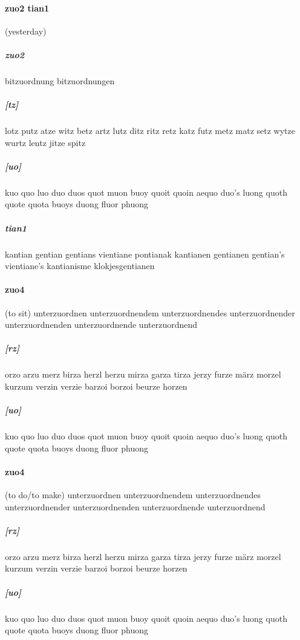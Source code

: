 \documentclass{article}
\begin{document}
\paragraph{zuo2 tian1}(yesterday) \subparagraph{zuo2}bitzuordnung bitzuordnungen
\subparagraph{[tz]}lotz
putz
atze
witz
betz
artz
lutz
ditz
ritz
retz
katz
futz
metz
matz
setz
wytze
wurtz
lentz
jitze
spitz
\subparagraph{[uo]}kuo
quo
luo
duo
duos
quot
muon
buoy
quoit
quoin
aequo
duo's
luong
quoth
quote
quota
buoys
duong
fluor
phuong
\subparagraph{tian1}kantian
gentian
gentians
vientiane
pontianak
kantianen
gentianen
gentian's
vientiane's
kantianisme
klokjesgentianen
\paragraph{zuo4}(to sit) unterzuordnen unterzuordnendem unterzuordnendes unterzuordnender unterzuordnenden unterzuordnende unterzuordnend
\subparagraph{[rz]}orzo
arzu
merz
birza
herzl
herzu
mirza
garza
tirza
jerzy
furze
märz
morzel
kurzum
verzin
verzie
barzoi
borzoi
beurze
horzen
\subparagraph{[uo]}kuo
quo
luo
duo
duos
quot
muon
buoy
quoit
quoin
aequo
duo's
luong
quoth
quote
quota
buoys
duong
fluor
phuong
\paragraph{zuo4}(to do/to make) unterzuordnen unterzuordnendem unterzuordnendes unterzuordnender unterzuordnenden unterzuordnende unterzuordnend
\subparagraph{[rz]}orzo
arzu
merz
birza
herzl
herzu
mirza
garza
tirza
jerzy
furze
märz
morzel
kurzum
verzin
verzie
barzoi
borzoi
beurze
horzen
\subparagraph{[uo]}kuo
quo
luo
duo
duos
quot
muon
buoy
quoit
quoin
aequo
duo's
luong
quoth
quote
quota
buoys
duong
fluor
phuong
\end{document}
